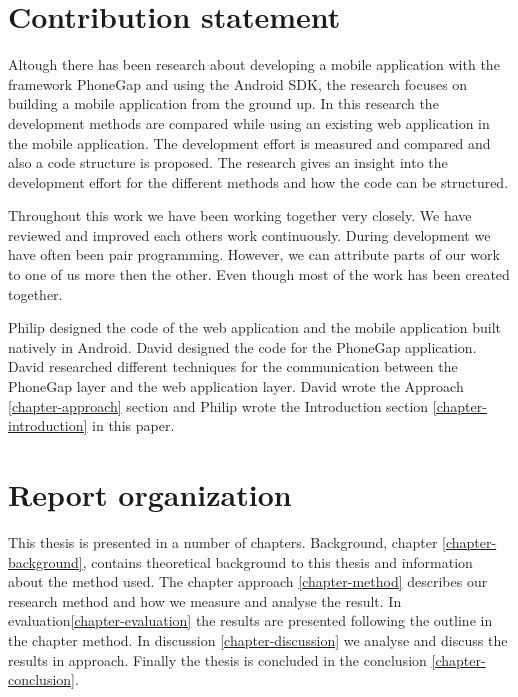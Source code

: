 \section{Contribution statement}\label{sec:contribution-statement}
Altough there has been research about developing a mobile application with the framework PhoneGap and using the Android SDK, the research focuses on building a mobile application from the ground up. In this research the development methods are compared while using an existing web application in the mobile application. The development effort is measured and compared and also a code structure is proposed. The research gives an insight into the development effort for the different methods and how the code can be structured.

Throughout this work we have been working together very closely. We have reviewed and improved each others work continuously. During development we have often been pair programming. However, we can attribute parts of our work to one of us more then the other. Even though most of the work has been created together. 

Philip designed the code of the web application and the mobile application built natively in Android. David designed the code for the PhoneGap application. David researched different techniques for the communication between the PhoneGap layer and the web application layer. David wrote the Approach \ref{chapter-approach} section and Philip wrote the Introduction section \ref{chapter-introduction} in this paper. 

\section{Report organization}\label{sec:report-organization}
This thesis is presented in a number of chapters. Background, chapter \ref{chapter-background}, contains theoretical background to this thesis and information about the method used. The chapter approach \ref{chapter-method} describes our research method and how we measure and analyse the result. In evaluation\ref{chapter-evaluation} the results are presented following the outline in the chapter method. In discussion \ref{chapter-discussion} we analyse and discuss the results in approach. Finally the thesis is concluded in the conclusion \ref{chapter-conclusion}.